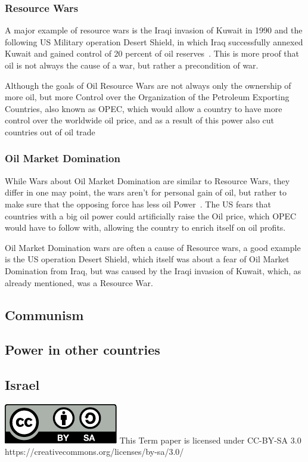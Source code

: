 \documentclass[12pt,a4paper]{article}
\begin{document}
		\subsubsection{Resource Wars}
		A major example of resource wars is the Iraqi invasion of Kuwait in 1990 and the following US Military operation Desert Shield, in which Iraq successfully annexed Kuwait and gained control of 20 percent of oil reserves~\cite{history-iraq-kuwait}. This is more proof that oil is not always the cause of a war, but rather a precondition of war.
		
		Although the goals of Oil Resource Wars are not always only the ownership of more oil, but more Control over the Organization of the Petroleum Exporting Countries, also known as OPEC, which would allow a country to have more control over the worldwide oil price, and as a result of this power also cut countries out of oil trade
		\subsubsection{Oil Market Domination}
		While Wars about Oil Market Domination are similar to Resource Wars, they differ in one may point, the wars aren't for personal gain of oil, but rather to make sure that the opposing force has less oil Power~\cite{fueling-fire-jeff-d}. The US fears that countries with a big oil power could artificially raise the Oil price, which OPEC would have to follow with, allowing the country to enrich itself on oil profits.
		
		Oil Market Domination wars are often a cause of Resource wars, a good example is the US operation Desert Shield, which itself was about a fear of Oil Market Domination from Iraq, but was caused by the Iraqi invasion of Kuwait, which, as already mentioned, was a Resource War.
		\subsection{Communism}
		\subsection{Power in other countries}
		\subsection{Israel}
		
		
	\newpage
	{
		{}
		
		\includegraphics{by-sa.pdf}
		This Term paper is licensed under CC-BY-SA 3.0\\
		https://creativecommons.org/licenses/by-sa/3.0/
	}
\end{document}
